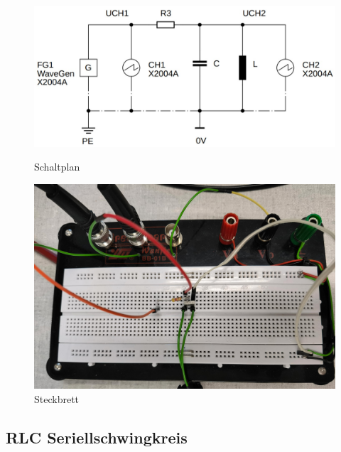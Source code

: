 \documentclass[12pt,a4paper,twoside]{article}
\begin{document}
\begin{figure}[H]
    \begin{minipage}[b]{.5\linewidth} %
        \includegraphics[width=1\linewidth]{nudes/Aufgabe 3 schaltplan.jpg}
        \caption{Schaltplan }
        \label{fig:a3s}
    \end{minipage}
    \hspace{0.01\linewidth}%
    \begin{minipage}[b]{.5\linewidth} %
        \includegraphics[width=1\linewidth]{nudes/a3 brett.jpg}
    \caption{Steckbrett}
    \label{fig:a3b}
    \end{minipage}
\end{figure}


\subsection{RLC Seriellschwingkreis}
\end{document}
